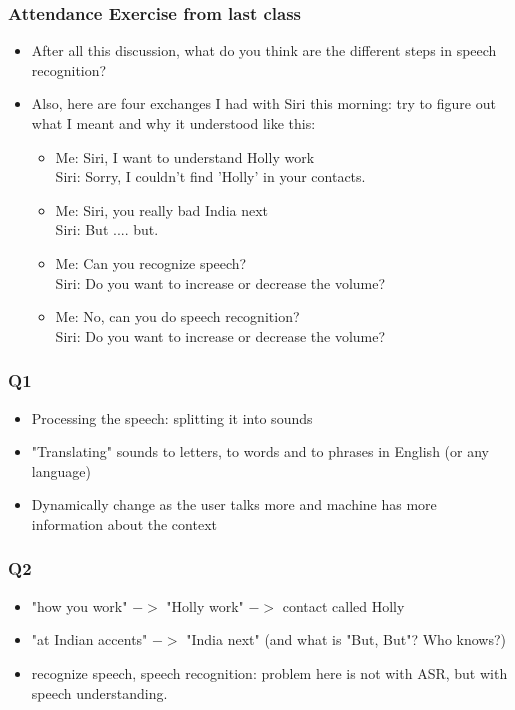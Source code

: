 \documentclass{beamer}
\begin{document}
\begin{frame}
\frametitle{Attendance Exercise from last class}
\begin{itemize}
\item After all this discussion, what do you think are the different steps in speech recognition?
\item Also, here are four exchanges I had with Siri this morning: try to figure out what I meant and why it understood like this: 
\begin{itemize}
\item Me: Siri, I want to understand Holly work \\
Siri: Sorry, I couldn't find 'Holly' in your contacts.
\item Me: Siri, you really bad India next \\
Siri: But .... but.
\item Me: Can you recognize speech? \\
Siri: Do you want to increase or decrease the volume?
\item Me: No, can you do speech recognition? \\
Siri: Do you want to increase or decrease the volume?
\end{itemize}
\end{itemize}
\end{frame}

\begin{frame}
\frametitle{Q1}
\begin{itemize}
\item Processing the speech: splitting it into sounds
\item "Translating" sounds to letters, to words and to phrases in English (or any language)
\item Dynamically change as the user talks more and machine has more information about the context
\end{itemize}
\end{frame}

\begin{frame}
\frametitle{Q2}
\begin{itemize}
\item "how you work" $->$ "Holly work" $->$ contact called Holly
\item "at Indian accents" $->$ "India next" (and what is "But, But"? Who knows?)
\item recognize speech, speech recognition: problem here is not with ASR, but with speech understanding.
\end{itemize}
\end{frame}
\end{document}
